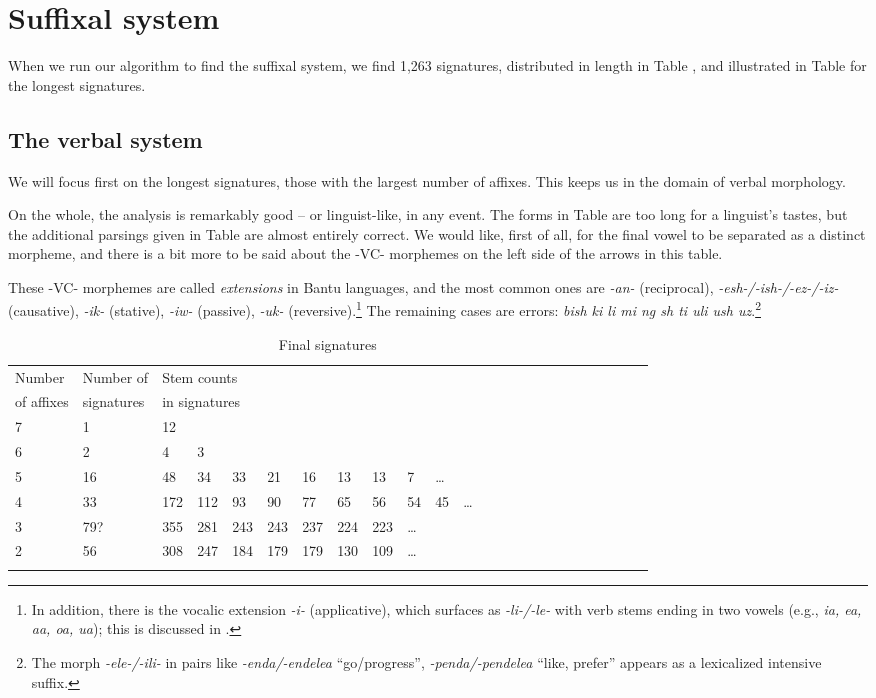 \documentclass[output=paper,colorlinks,citecolor=brown,
]{langscibook}
\begin{document}
\section{Suffixal system}

When we run our algorithm to find the suffixal system, we find 1,263 signatures, distributed in length in Table , and illustrated in Table  for the longest signatures.

\subsection{The verbal system}

We will focus first on the longest signatures, those with the largest number of affixes. This keeps us in the domain of verbal morphology.

On the whole, the analysis is remarkably good -- or linguist-like, in any event. The forms in Table  are too long for a linguist's tastes, but the additional parsings given in Table  are almost entirely correct. We would like, first of all, for the final vowel to be separated as a distinct morpheme, and there is a bit more to be said about the -VC- morphemes on the left side of the arrows in this table.

These -VC- morphemes are called \textit{extensions} in Bantu languages, and the most common ones are \textit{-an-} (reciprocal), \textit{-esh-/-ish-/-ez-/-iz-} (causative), \textit{-ik-} (stative), \textit{-iw-} (passive), \textit{-uk-} (reversive).\footnote{In addition, there is the vocalic extension \textit{-i-} (applicative), which surfaces as \textit{-li-/-le-} with verb stems ending in two vowels (e.g., \textit{ia, ea, aa, oa, ua}); this is discussed in \cite[112, 146]{Mpiranya2014}.} The remaining cases are errors: \textit{bish ki li mi ng sh ti uli ush uz}.\footnote{The morph \textit{-ele-/-ili-} in pairs like \textit{-enda/-endelea} ``go/progress'', \textit{-penda/-pendelea} ``like, prefer'' appears as a lexicalized intensive suffix.} 



\begin{table}
\begin{tabular}{llllllllllllllllllllllll} \lsptoprule
Number  &  Number of  & \multicolumn{10}{l}{Stem counts } \\
 of affixes &   signatures & \multicolumn{10}{l}{in signatures} \\ \midrule
7 & 1 & 12  \\
6 & 2 & 4 & 3  \\
5 & 16 & 48 & 34 & 33 & 21 & 16 & 13 & 13 & 7 &    \ldots \\
4 & 33 & 172 & 112 & 93 & 90 & 77 & 65& 56 & 54 & 45& \ldots\\
3 &  79? & 355 & 281 & 243 & 243  & 237 & 224 & 223 &  \ldots\\
2 & 56 & 308 & 247 & 184 & 179 & 179 & 130 & 109 & \ldots \\ \lspbottomrule
\end{tabular}
\caption{Final signatures}
\label{final-sigs-1}
\end{table}
\end{document}
